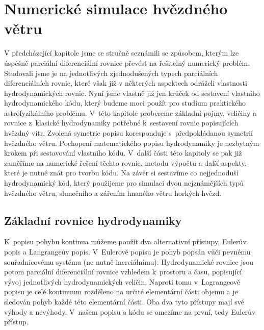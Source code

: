 \chapter{Numerické simulace hvězdného větru}

V předcházející kapitole jsme se stručně seznámili se způsobem, kterým lze úspěšně parciální diferenciální rovnice převést na řešitelný numerický problém. Studovali jsme je na jednotlivých zjednodušených typech parciálních diferenciálních rovnic, které však již v některých aspektech odráželi vlastnosti hydrodynamických rovnic. Nyní jsme vlastně již jen krůček od sestavení vlastního hydrodynamického kódu, který budeme moci použít pro studium praktického astrofyzikálního problému. V~této kapitole probereme základní pojmy, veličiny a rovnice z~klasické hydrodynamiky potřebné k~sestavení rovnic popisujících hvězdný vítr. Zvolená symetrie popisu koresponduje s~předpokládanou symetrií hvězdného větru. Pochopení matematického popisu hydrodynamiky je nezbytným krokem při sestavování vlastního kódu. V~další části této kapitoly se pak již zaměříme na numerické řešení těchto rovnic, metodu výpočtu a další aspekty, které je nutné znát pro tvorbu kódu. Na závěr si sestavíme co nejjednoduší hydrodynamický kód, který použijeme pro simulaci dvou nejznámějších typů hvězdného větru, slunečního a zářením hnaného větru horkých hvězd.
\section{Základní rovnice hydrodynamiky}
K~popisu pohybu kontinua můžeme použít dva alternativní přístupy, Eulerův popis a Langrangeův popis. V~Eulerově popisu je pohyb popsán vůči pevnému souřadnicovému systému (ne nutně inerciálnímu). Hydrodynamické rovnice jsou potom parciální diferenciální rovnice vzhledem k~prostoru a času, popisující vývoj jednotlivých hydrodynamických veličin. Naproti tomu v~Lagrangeově popisu je celé kontinuum rozděleno na určité elementární části objemu a je sledován pohyb každé této elementární části. Oba dva tyto přístupy mají své výhody a nevýhody. V~našem popisu a kódu se omezíme na první, tedy Eulerův přístup.

